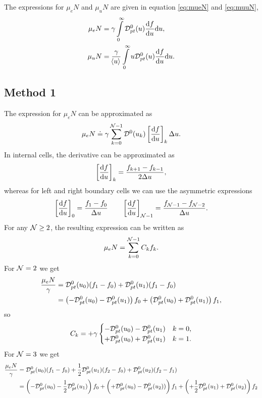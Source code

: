 \documentclass{book}
\newcommand{\MEAN}[1]{\ensuremath{\!\left\langle{{#1}}\right\rangle}}
\begin{document}
The expressions for $\mu_eN$ and $\mu_uN$ are given in equation \eqref{eq:mueN}
and \eqref{eq:muuN},
\begin{align*}
	\mu_eN &= \gamma\int\limits_0^\infty {\cal D}_{pt}^0(u)\DERIV{f}{u}\dd{u}, \\
	\mu_uN &= \frac{\gamma}{\MEAN{u}}\int\limits_0^\infty u{\cal D}_{pt}^0(u)\DERIV{f}{u}\dd{u}.
\end{align*}


\subsection*{Method 1}
The expression for $\mu_eN$ can be approximated as
\[
	\mu_eN \doteq \gamma\sum\limits_{k=0}^{{\cal N}-1}{\cal D}^0(u_k)\left[\DERIV{f}{u}\right]_k\Delta u.
\]
In internal cells, the derivative can be approximated as
\[
	\left[\DERIV{f}{u}\right]_k = \frac{f_{k+1}-f_{k-1}}{2\Delta u},
\]
whereas for left and right boundary cells we can use the asymmetric expressions
\[
	\left[\DERIV{f}{u}\right]_0 = \frac{f_{1}-f_{0}}{\Delta u}
	\quad
	\quad
	\left[\DERIV{f}{u}\right]_{{\cal N}-1} = \frac{f_{{\cal N}-1}-f_{{\cal N}-2}}{\Delta u}.
\]
For any ${\cal N} \geq 2$, the resulting expression can be written as
\begin{equation}
	\mu_eN = \sum\limits_{k=0}^{{\cal N}-1}C_kf_k.
\end{equation}
For ${\cal N} = 2$ we get
\begin{align*}
	\frac{\mu_eN}{\gamma}
	&= {\cal D}_{pt}^0(u_0)(f_{1}-f_{0}) + {\cal D}_{pt}^0(u_{1})(f_{1}-f_{0}) \\
	&= \left(-{\cal D}_{pt}^0(u_0)-{\cal D}_{pt}^0(u_{1})\right)f_{0} + \left({\cal D}_{pt}^0(u_0)+{\cal D}_{pt}^0(u_{1})\right)f_{1},
\end{align*}
so
\begin{equation}
	C_k = +\gamma\begin{cases}
			-{\cal D}_{pt}^0(u_0)-{\cal D}_{pt}^0(u_{1}) & k=0, \\
			+{\cal D}_{pt}^0(u_0)+{\cal D}_{pt}^0(u_{1}) & k=1.
	\end{cases}
\end{equation}
For ${\cal N} = 3$ we get
\begin{align*}
	\frac{\mu_eN}{\gamma}
	&= {\cal D}_{pt}^0(u_0)(f_{1}-f_{0}) + \frac{1}{2}{\cal D}_{pt}^0(u_1)(f_{2}-f_{0}) + {\cal D}_{pt}^0(u_{2})(f_{2}-f_{1}) \\
	&=	  \left( -           {\cal D}_{pt}^0(u_0) - \frac{1}{2}{\cal D}_{pt}^0(u_{1}) \right)f_{0}
		+ \left( +           {\cal D}_{pt}^0(u_0) -            {\cal D}_{pt}^0(u_{2}) \vphantom{\frac{1}{2}})\right)f_{1}
		+ \left( +\frac{1}{2}{\cal D}_{pt}^0(u_1) +            {\cal D}_{pt}^0(u_{2}) \right)f_{2}
\end{align*}
\end{document}
